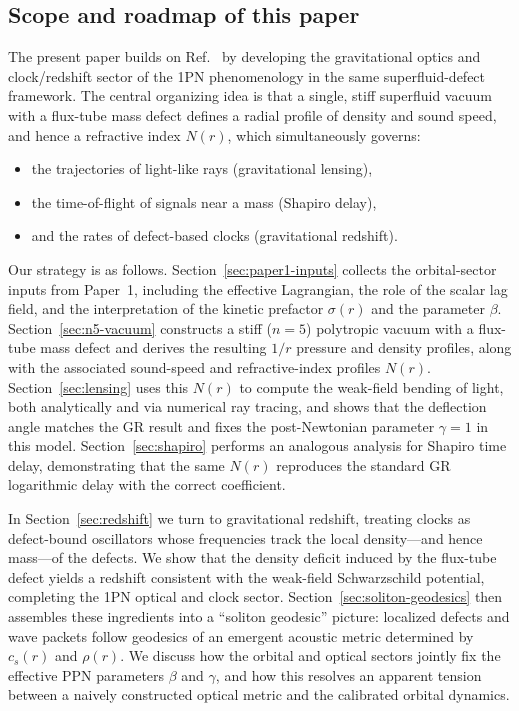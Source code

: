 \documentclass[11pt]{article}
\begin{document}
\subsection{Scope and roadmap of this paper}
\label{subsec:intro-roadmap}

The present paper builds on Ref.~\cite{Norris:2025Orbits} by developing the
gravitational optics and clock/redshift sector of the 1PN phenomenology in the
same superfluid-defect framework.
The central organizing idea is that a single, stiff superfluid vacuum with a
flux-tube mass defect defines a radial profile of density and sound speed, and
hence a refractive index $N(r)$, which simultaneously governs:

\begin{itemize}
  \item the trajectories of light-like rays (gravitational lensing),
  \item the time-of-flight of signals near a mass (Shapiro delay),
  \item and the rates of defect-based clocks (gravitational redshift).
\end{itemize}

Our strategy is as follows.
Section~\ref{sec:paper1-inputs} collects the orbital-sector inputs from Paper~1,
including the effective Lagrangian, the role of the scalar lag field, and the
interpretation of the kinetic prefactor $\sigma(r)$ and the parameter $\beta$.
Section~\ref{sec:n5-vacuum} constructs a stiff ($n=5$) polytropic vacuum with a
flux-tube mass defect and derives the resulting $1/r$ pressure and density
profiles, along with the associated sound-speed and refractive-index profiles
$N(r)$.
Section~\ref{sec:lensing} uses this $N(r)$ to compute the weak-field bending of
light, both analytically and via numerical ray tracing, and shows that the
deflection angle matches the GR result and fixes the post-Newtonian parameter
$\gamma = 1$ in this model.
Section~\ref{sec:shapiro} performs an analogous analysis for Shapiro time delay,
demonstrating that the same $N(r)$ reproduces the standard GR logarithmic delay
with the correct coefficient.

In Section~\ref{sec:redshift} we turn to gravitational redshift, treating clocks
as defect-bound oscillators whose frequencies track the local density---and hence
mass---of the defects.
We show that the density deficit induced by the flux-tube defect yields a
redshift consistent with the weak-field Schwarzschild potential, completing the
1PN optical and clock sector.
Section~\ref{sec:soliton-geodesics} then assembles these ingredients into a
``soliton geodesic'' picture: localized defects and wave packets follow
geodesics of an emergent acoustic metric determined by $c_s(r)$ and $\rho(r)$.
We discuss how the orbital and optical sectors jointly fix the effective PPN
parameters $\beta$ and $\gamma$, and how this resolves an apparent tension
between a naively constructed optical metric and the calibrated orbital dynamics.
\end{document}
